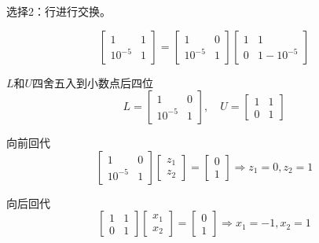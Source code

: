\begin{example}
    选择2：行进行交换。

    \begin{equation} \left[\begin{array}{cc}1 & 1 \\ 10^{-5} & 1\end{array}\right]=\left[\begin{array}{cc}1 & 0 \\ 10^{-5} & 1\end{array}\right]\left[\begin{array}{cc}1 & 1 \\ 0 & 1-10^{-5}\end{array}\right] \end{equation}

    $L$和$U$四舍五入到小数点后四位
    \begin{equation}
        L=\left[\begin{array}{cc}
                1       & 0 \\
                10^{-5} & 1
            \end{array}\right], \quad U=\left[\begin{array}{ll}
                1 & 1 \\
                0 & 1
            \end{array}\right]
    \end{equation}

    向前回代
    \begin{equation}
        \left[\begin{array}{cc}
                1       & 0 \\
                10^{-5} & 1
            \end{array}\right]\left[\begin{array}{l}
                z_{1} \\
                z_{2}
            \end{array}\right]=\left[\begin{array}{l}
                0 \\
                1
            \end{array}\right] \Rightarrow z_{1}=0, z_{2}=1
    \end{equation}

    向后回代
    \begin{equation}
        \left[\begin{array}{ll}
                1 & 1 \\
                0 & 1
            \end{array}\right]\left[\begin{array}{l}
                x_{1} \\
                x_{2}
            \end{array}\right]=\left[\begin{array}{l}
                0 \\
                1
            \end{array}\right] \Rightarrow x_{1}=-1, x_{2}=1
    \end{equation}


\end{example}
